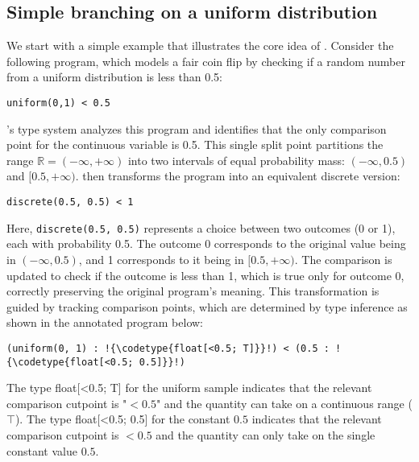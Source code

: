 \documentclass[acmsmall,screen,dvipsnames,x11names,nonacm,anonymous,review]{acmart}
\newcommand{\codetype}[1]{\textcolor{typecolor}{\ttfamily\small#1}}
\newcommand{\Slice}{\text{\scshape Slice}\xspace}
\newcommand{\R}{\mathbb{R}}
\begin{document}
\subsection{Simple branching on a uniform distribution}

We start with a simple example that illustrates the core idea of \Slice. Consider the following program, which models a fair coin flip by checking if a random number from a uniform distribution is less than 0.5:

\begin{lstlisting}[aboveskip=1em,belowskip=1em]
    uniform(0,1) < 0.5
\end{lstlisting}

\noindent \Slice's type system analyzes this program and identifies that the only comparison point for the continuous variable is 0.5. This single split point partitions the range $\R = (-\infty, +\infty)$ into two intervals of equal probability mass: $(-\infty, 0.5)$ and $[0.5, +\infty)$. \Slice then transforms the program into an equivalent discrete version:

\begin{lstlisting}[aboveskip=1em,belowskip=1em]
    discrete(0.5, 0.5) < 1
\end{lstlisting}

\noindent Here, \texttt{discrete(0.5, 0.5)} represents a choice between two outcomes (0 or 1), each with probability 0.5. The outcome 0 corresponds to the original value being in $(-\infty, 0.5)$, and 1 corresponds to it being in $[0.5, +\infty)$. The comparison is updated to check if the outcome is less than 1, which is true only for outcome 0, correctly preserving the original program's meaning. This transformation is guided by tracking comparison points, which are determined by type inference as shown in the annotated program below:

\begin{lstlisting}[aboveskip=1em,belowskip=1em,escapechar=!]
    (uniform(0, 1) : !{\codetype{float[<0.5; T]}}!) < (0.5 : !{\codetype{float[<0.5; 0.5]}}!)
\end{lstlisting}

The type \codetype{float[<0.5; T]} for the uniform sample indicates that the relevant comparison cutpoint is "$<\!\!0.5$" and the quantity can take on a continuous range ($\top$). 
The type \codetype{float[<0.5; 0.5]} for the constant $0.5$ indicates that the relevant comparison cutpoint is $< 0.5$ and the quantity can only take on the single constant value $0.5$. 
\end{document}
